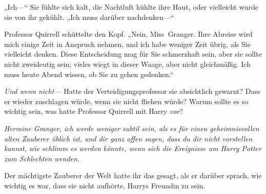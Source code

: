 „Ich—“ Sie fühlte sich kalt, die Nachtluft kühlte ihre Haut, oder vielleicht wurde sie von ihr gekühlt. „Ich muss darüber nachdenken—“

Professor Quirrell schüttelte den Kopf. „Nein, Miss~Granger. Ihre Abreise wird mich einige Zeit in Anspruch nehmen, und ich habe weniger Zeit übrig, als Sie vielleicht denken. Diese Entscheidung mag für Sie schmerzhaft sein, aber sie sollte nicht zweideutig sein; vieles wiegt in dieser Waage, aber nicht gleichmäßig. Ich muss heute Abend wissen, ob Sie zu gehen gedenken.“

%
\emph{Und wenn nicht—}
Hatte der Verteidigungsprofessor sie absichtlich gewarnt? Dass er wieder zuschlagen würde, wenn sie nicht fliehen würde?
%
Warum sollte es so wichtig sein, was hatte Professor Quirrell mit Harry \emph{vor}?

\emph{Hermine Granger, ich werde weniger subtil sein, als es für einen geheimnisvollen alten Zauberer üblich ist, und dir ganz offen sagen, dass du dir nicht vorstellen kannst, wie schlimm es werden könnte, wenn sich die Ereignisse um Harry Potter zum Schlechten wenden.}

Der mächtigste Zauberer der Welt hatte ihr das gesagt, als er darüber sprach, wie wichtig es war, dass sie nicht aufhörte, Harrys Freundin zu sein.

